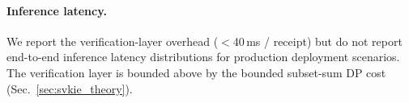 \paragraph{Inference latency.}  We report the verification-layer
overhead ($<$40\,ms / receipt) but do not report end-to-end inference
latency distributions for production deployment scenarios.  The
verification layer is bounded above by the bounded subset-sum DP
cost (Sec.~\ref{sec:svkie_theory}).
